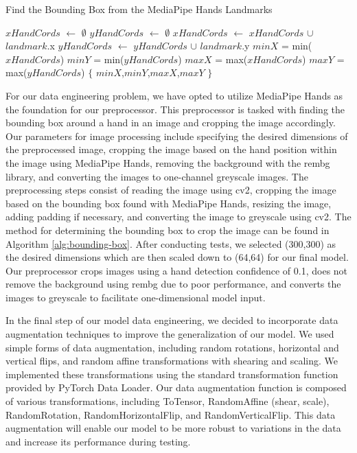 \documentclass[a4paper]{article}
\begin{document}
\begin{algorithm}
	\caption{Find the Bounding Box from the MediaPipe Hands Landmarks} 
	\label{alg:bounding-box}
	\begin{algorithmic}[1]
	\State $xHandCords$ $\gets$ $\emptyset$
	\State $yHandCords$ $\gets$ $\emptyset$
			\State $xHandCords$ $\gets$ $xHandCords$ $\cup$ $landmark$.x
			\State $yHandCords$ $\gets$ $yHandCords$ $\cup$ $landmark$.y
		\EndFor
		\State $minX$ = min($xHandCords$)
		\State $minY$ = min($yHandCords$)
		\State $maxX$ = max($xHandCords$)
		\State $maxY$ = max($yHandCords$)
		\State \Return $\{$ $minX$,$minY$,$maxX$,$maxY$ $\}$
	\end{algorithmic} 
\end{algorithm}


For our data engineering problem, we have opted to utilize MediaPipe Hands as the foundation for our preprocessor. This preprocessor is tasked with finding the bounding box around a hand in an image and cropping the image accordingly. Our parameters for image processing include specifying the desired dimensions of the preprocessed image, cropping the image based on the hand position within the image using MediaPipe Hands, removing the background with the rembg library, and converting the images to one-channel greyscale images. The preprocessing steps consist of reading the image using cv2, cropping the image based on the bounding box found with MediaPipe Hands, resizing the image, adding padding if necessary, and converting the image to greyscale using cv2. The method for determining the bounding box to crop the image can be found in Algorithm \ref{alg:bounding-box}. After conducting tests, we selected (300,300) as the desired dimensions which are then scaled down to (64,64) for our final model. Our preprocessor crops images using a hand detection confidence of 0.1, does not remove the background using rembg due to poor performance, and converts the images to greyscale to facilitate one-dimensional model input.


In the final step of our model data engineering, we decided to incorporate data augmentation techniques to improve the generalization of our model. We used simple forms of data augmentation, including random rotations, horizontal and vertical flips, and random affine transformations with shearing and scaling. We implemented these transformations using the standard transformation function provided by PyTorch Data Loader. Our data augmentation function is composed of various transformations, including ToTensor, RandomAffine (shear, scale), RandomRotation, RandomHorizontalFlip, and RandomVerticalFlip. This data augmentation will enable our model to be more robust to variations in the data and increase its performance during testing.
\end{document}
